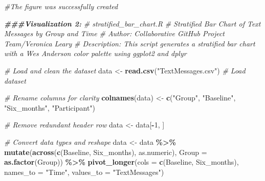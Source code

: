 \documentclass[
]{article}
\newenvironment{Shaded}{\begin{snugshade}}{\end{snugshade}}
\newcommand{\AttributeTok}[1]{\textcolor[rgb]{0.13,0.29,0.53}{#1}}
\newcommand{\CommentTok}[1]{\textcolor[rgb]{0.56,0.35,0.01}{\textit{#1}}}
\newcommand{\DecValTok}[1]{\textcolor[rgb]{0.00,0.00,0.81}{#1}}
\newcommand{\DocumentationTok}[1]{\textcolor[rgb]{0.56,0.35,0.01}{\textbf{\textit{#1}}}}
\newcommand{\FunctionTok}[1]{\textcolor[rgb]{0.13,0.29,0.53}{\textbf{#1}}}
\newcommand{\NormalTok}[1]{#1}
\newcommand{\OtherTok}[1]{\textcolor[rgb]{0.56,0.35,0.01}{#1}}
\newcommand{\SpecialCharTok}[1]{\textcolor[rgb]{0.81,0.36,0.00}{\textbf{#1}}}
\newcommand{\StringTok}[1]{\textcolor[rgb]{0.31,0.60,0.02}{#1}}
\begin{document}
\begin{Shaded}
\begin{Highlighting}[]
\CommentTok{\#The figure was successfully created}
\end{Highlighting}
\end{Shaded}

\begin{Shaded}
\begin{Highlighting}[]
\DocumentationTok{\#\#\#Visualization 2:}
\CommentTok{\# stratified\_bar\_chart.R}
\CommentTok{\# Stratified Bar Chart of Text Messages by Group and Time}
\CommentTok{\# Author: Collaborative GitHub Project Team/Veronica Leary}
\CommentTok{\# Description: This script generates a stratified bar chart with a Wes Anderson color palette using ggplot2 and dplyr}

\CommentTok{\# Load and clean the dataset}
\NormalTok{data }\OtherTok{\textless{}{-}} \FunctionTok{read.csv}\NormalTok{(}\StringTok{"TextMessages.csv"}\NormalTok{)  }\CommentTok{\# Load dataset}

\CommentTok{\# Rename columns for clarity}
\FunctionTok{colnames}\NormalTok{(data) }\OtherTok{\textless{}{-}} \FunctionTok{c}\NormalTok{(}\StringTok{"Group"}\NormalTok{, }\StringTok{"Baseline"}\NormalTok{, }\StringTok{"Six\_months"}\NormalTok{, }\StringTok{"Participant"}\NormalTok{)}

\CommentTok{\# Remove redundant header row}
\NormalTok{data }\OtherTok{\textless{}{-}}\NormalTok{ data[}\SpecialCharTok{{-}}\DecValTok{1}\NormalTok{, ]}

\CommentTok{\# Convert data types and reshape}
\NormalTok{data }\OtherTok{\textless{}{-}}\NormalTok{ data }\SpecialCharTok{\%\textgreater{}\%}
  \FunctionTok{mutate}\NormalTok{(}\FunctionTok{across}\NormalTok{(}\FunctionTok{c}\NormalTok{(Baseline, Six\_months), as.numeric),}
         \AttributeTok{Group =} \FunctionTok{as.factor}\NormalTok{(Group)) }\SpecialCharTok{\%\textgreater{}\%}
  \FunctionTok{pivot\_longer}\NormalTok{(}\AttributeTok{cols =} \FunctionTok{c}\NormalTok{(Baseline, Six\_months),}
               \AttributeTok{names\_to =} \StringTok{"Time"}\NormalTok{,}
               \AttributeTok{values\_to =} \StringTok{"TextMessages"}\NormalTok{)}
\end{Highlighting}
\end{Shaded}
\end{document}
